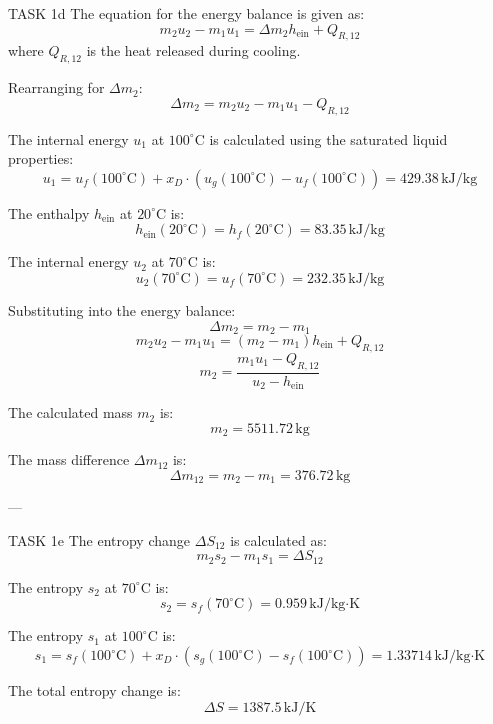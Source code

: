 TASK 1d  
The equation for the energy balance is given as:  
\[
m_2 u_2 - m_1 u_1 = \Delta m_2 h_{\text{ein}} + Q_{R,12}
\]  
where \( Q_{R,12} \) is the heat released during cooling.  

Rearranging for \( \Delta m_2 \):  
\[
\Delta m_2 = m_2 u_2 - m_1 u_1 - Q_{R,12}
\]  

The internal energy \( u_1 \) at \( 100^\circ\text{C} \) is calculated using the saturated liquid properties:  
\[
u_1 = u_f(100^\circ\text{C}) + x_D \cdot (u_g(100^\circ\text{C}) - u_f(100^\circ\text{C})) = 429.38 \, \text{kJ/kg}
\]  

The enthalpy \( h_{\text{ein}} \) at \( 20^\circ\text{C} \) is:  
\[
h_{\text{ein}}(20^\circ\text{C}) = h_f(20^\circ\text{C}) = 83.35 \, \text{kJ/kg}
\]  

The internal energy \( u_2 \) at \( 70^\circ\text{C} \) is:  
\[
u_2(70^\circ\text{C}) = u_f(70^\circ\text{C}) = 232.35 \, \text{kJ/kg}
\]  

Substituting into the energy balance:  
\[
\Delta m_2 = m_2 - m_1
\]  
\[
m_2 u_2 - m_1 u_1 = (m_2 - m_1) h_{\text{ein}} + Q_{R,12}
\]  
\[
m_2 = \frac{m_1 u_1 - Q_{R,12}}{u_2 - h_{\text{ein}}}
\]  

The calculated mass \( m_2 \) is:  
\[
m_2 = 5511.72 \, \text{kg}
\]  

The mass difference \( \Delta m_{12} \) is:  
\[
\Delta m_{12} = m_2 - m_1 = 376.72 \, \text{kg}
\]  

---

TASK 1e  
The entropy change \( \Delta S_{12} \) is calculated as:  
\[
m_2 s_2 - m_1 s_1 = \Delta S_{12}
\]  

The entropy \( s_2 \) at \( 70^\circ\text{C} \) is:  
\[
s_2 = s_f(70^\circ\text{C}) = 0.959 \, \text{kJ/kg·K}
\]  

The entropy \( s_1 \) at \( 100^\circ\text{C} \) is:  
\[
s_1 = s_f(100^\circ\text{C}) + x_D \cdot (s_g(100^\circ\text{C}) - s_f(100^\circ\text{C})) = 1.33714 \, \text{kJ/kg·K}
\]  

The total entropy change is:  
\[
\Delta S = 1387.5 \, \text{kJ/K}
\]